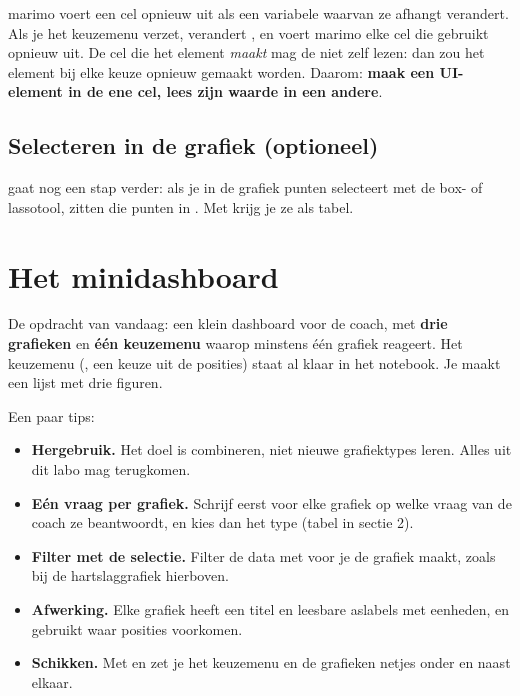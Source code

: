 \documentclass[11pt,a4paper]{article}
\begin{document}
\begin{kernidee}
marimo voert een cel opnieuw uit als een variabele waarvan ze afhangt
verandert. Als je het keuzemenu verzet, verandert
, en voert marimo elke cel die
 gebruikt opnieuw uit. De cel die het element
\emph{maakt} mag de  niet zelf lezen: dan zou het element
bij elke keuze opnieuw gemaakt worden. Daarom: \textbf{maak een
UI-element in de ene cel, lees zijn waarde in een andere}.
\end{kernidee}

\subsection{Selecteren in de grafiek (optioneel)}

 gaat nog een stap verder: als je in de
grafiek punten selecteert met de box- of lassotool, zitten die punten in
. Met  krijg
je ze als tabel.

\section{Het minidashboard}

De opdracht van vandaag: een klein dashboard voor de coach, met
\textbf{drie grafieken} en \textbf{één keuzemenu} waarop minstens één
grafiek reageert. Het keuzemenu (, een keuze
uit de posities) staat al klaar in het notebook. Je maakt een lijst
 met drie figuren.

Een paar tips:

\begin{itemize}
  \item \textbf{Hergebruik.} Het doel is combineren, niet nieuwe
        grafiektypes leren. Alles uit dit labo mag terugkomen.
  \item \textbf{Eén vraag per grafiek.} Schrijf eerst voor elke grafiek op
        welke vraag van de coach ze beantwoordt, en kies dan het type
        (tabel in sectie 2).
  \item \textbf{Filter met de selectie.} Filter de data met
         voor je de grafiek maakt, zoals
        bij de hartslaggrafiek hierboven.
  \item \textbf{Afwerking.} Elke grafiek heeft een titel en leesbare
        aslabels met eenheden, en gebruikt  waar
        posities voorkomen.
  \item \textbf{Schikken.} Met  en  zet je
        het keuzemenu en de grafieken netjes onder en naast elkaar.
\end{itemize}
\end{document}
